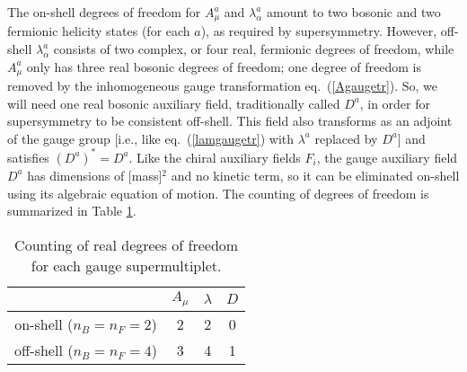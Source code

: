 \documentclass[12pt]{article}
\begin{document}
The on-shell degrees of freedom for $A^a_\mu$ and $\lambda^a_\alpha$
amount to two bosonic and two fermionic helicity states (for each $a$), as
required by supersymmetry. However, off-shell $\lambda^a_\alpha$ consists
of two complex, or four real, fermionic degrees of freedom, while
$A^a_\mu$ only has three real bosonic degrees of freedom; one degree of
freedom is removed by the inhomogeneous gauge transformation
eq.~(\ref{Agaugetr}). So, we will need one real bosonic auxiliary field,
traditionally called $D^a$, in order for supersymmetry to be consistent
off-shell. This field also transforms as an adjoint of the gauge group
[i.e., like eq.~(\ref{lamgaugetr}) with $\lambda^a$ replaced by $D^a$] and
satisfies $(D^a)^* = D^a$. Like the chiral auxiliary fields $F_i$, the
gauge auxiliary field $D^a$ has dimensions of [mass]$^2$ and no kinetic
term, so it can be eliminated on-shell using its algebraic equation of
motion. The counting of degrees of freedom is summarized in Table
\ref{table:gaugedofcounting}.
\renewcommand{\arraystretch}{1.45}
\begin{table}[tb]
\begin{center}
\begin{tabular}{|c|c|c|c|}
\hline
 & $A_\mu$ & $\lambda$ & $D$ \\
\hline
on-shell ($n_B=n_F=2$) & 2 & 2 & 0 \\
\hline
off-shell ($n_B=n_F=4$) & 3 & 4 & 1 \\
\hline
\end{tabular}
\caption{Counting of real degrees of freedom for each gauge
supermultiplet. \label{table:gaugedofcounting}}
\vspace{-0.4cm}
\end{center}
\end{table}
\end{document}
